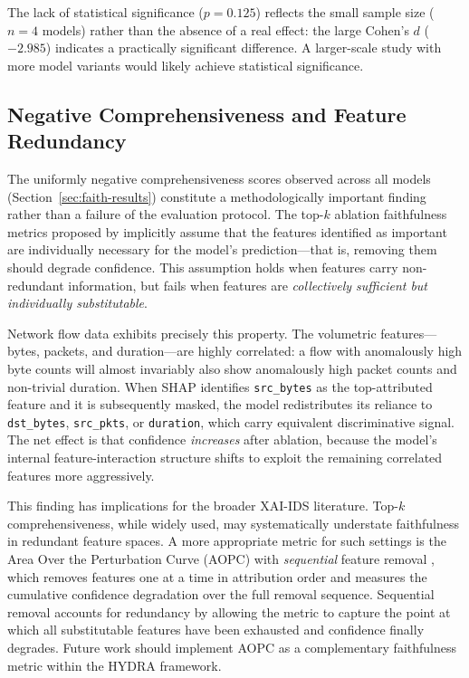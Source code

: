 \documentclass[12pt,a4paper]{report}
\begin{document}
The lack of statistical significance ($p = 0.125$) reflects the small sample size ($n = 4$ models) rather than the absence of a real effect: the large Cohen's $d$ ($-2.985$) indicates a practically significant difference. A larger-scale study with more model variants would likely achieve statistical significance.

\subsection*{Negative Comprehensiveness and Feature Redundancy}
\label{sec:neg-comp}

The uniformly negative comprehensiveness scores observed across all models (Section~\ref{sec:faith-results}) constitute a methodologically important finding rather than a failure of the evaluation protocol. The top-$k$ ablation faithfulness metrics proposed by \citet{deyoung2020} implicitly assume that the features identified as important are individually necessary for the model's prediction---that is, removing them should degrade confidence. This assumption holds when features carry non-redundant information, but fails when features are \textit{collectively sufficient but individually substitutable}.

Network flow data exhibits precisely this property. The volumetric features---bytes, packets, and duration---are highly correlated: a flow with anomalously high byte counts will almost invariably also show anomalously high packet counts and non-trivial duration. When SHAP identifies \texttt{src\_bytes} as the top-attributed feature and it is subsequently masked, the model redistributes its reliance to \texttt{dst\_bytes}, \texttt{src\_pkts}, or \texttt{duration}, which carry equivalent discriminative signal. The net effect is that confidence \textit{increases} after ablation, because the model's internal feature-interaction structure shifts to exploit the remaining correlated features more aggressively.

This finding has implications for the broader XAI-IDS literature. Top-$k$ comprehensiveness, while widely used, may systematically understate faithfulness in redundant feature spaces. A more appropriate metric for such settings is the Area Over the Perturbation Curve (AOPC) with \textit{sequential} feature removal \citep{samek2017}, which removes features one at a time in attribution order and measures the cumulative confidence degradation over the full removal sequence. Sequential removal accounts for redundancy by allowing the metric to capture the point at which all substitutable features have been exhausted and confidence finally degrades. Future work should implement AOPC as a complementary faithfulness metric within the HYDRA framework.
\end{document}
